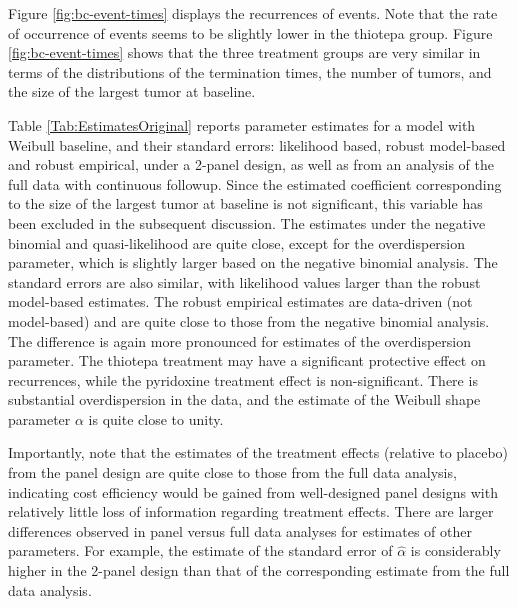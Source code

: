\documentclass[12pt]{article}
\begin{document}
Figure \ref{fig:bc-event-times} displays the recurrences of events. Note that the rate of occurrence of events seems to be slightly lower in the thiotepa group. Figure \ref{fig:bc-event-times} shows that the three treatment groups are very similar in terms of the distributions of the termination times, the number of tumors, and the size of the largest tumor at baseline.  


Table \ref{Tab:EstimatesOriginal} reports parameter estimates for a model with Weibull baseline, and their standard errors: likelihood based, robust model-based and robust empirical, under a 2-panel design, as well as from an analysis of the full data with continuous followup. Since the estimated coefficient corresponding to the size of the largest tumor at baseline is not significant, this variable has been excluded in the subsequent discussion. The estimates under the negative binomial and quasi-likelihood are quite close, except for the overdispersion parameter, which is slightly larger based on the negative binomial analysis. The standard errors are also similar, with likelihood values larger than the robust model-based estimates. The robust empirical estimates are data-driven (not model-based) and are quite close to those from the negative binomial analysis. The difference is again more pronounced for estimates of the overdispersion parameter. The thiotepa treatment may have a significant protective effect on recurrences, while the pyridoxine treatment effect is non-significant. There is substantial overdispersion in the data, and the estimate of the Weibull shape parameter $\alpha$ is quite close to unity. 

Importantly, note that the estimates of the treatment effects (relative to placebo) from the panel design are quite close to those from the full data analysis, indicating cost efficiency would be gained from well-designed panel designs with relatively little loss of information regarding treatment effects. There are larger differences observed in panel versus full data analyses for estimates of other parameters. For example, the estimate of the standard error of $\hat{\alpha}$ is considerably higher in the 2-panel design than that of the corresponding estimate from the full data analysis. 


\end{document}
